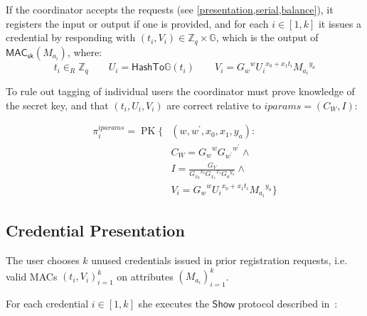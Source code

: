\documentclass{article}
\begin{document}
If the coordinator accepts the requests (see \cref{presentation,serial,balance}), it registers the input or output if one is provided, and for each $i \in [1,k]$ it issues a credential by responding with
$(t_i, V_i) \in \mathbb{Z}_q \times \mathbb{G}$,
which is the output of
$\mathsf{MAC}_{\mathsf{sk}}(M_{a_i})$,
where:
\[
  t_i \in_{R} \mathbb{Z}_{q}
  \qquad
  U_i = \mathsf{HashTo\mathbb{G}}(t_i)
  \qquad
  V_i={G_w}^{w} {U_i}^{x_{0}+x_{1} t_i}{M_{a_i}}^{y_a}
\]


To rule out tagging of individual users the coordinator must prove knowledge of the secret key, and that $(t_i, U_i, V_i)$ are correct relative to $\mathit{iparams}=(C_{W}, I)$:

\begin{align*}
  \pi_{i}^{\mathit{iparams}}=\operatorname{PK}\{ & (w, w^{\prime}, x_{0}, x_{1}, y_a): \\
                                                 &C_{W}={G_{w}}^{w} {G_{w^{\prime}}}^{w^\prime} \land \\
                                                 &I=\frac{G_{V}}{{G_{x_{0}}}^{x_0} {G_{x_1}}^{x_1} {G_a}^{y_a}}  \land \\
                                                 &V_i={G_w}^{w}{U_i}^{x_{0}+x_{1}t_i} {M_{a_i}}^{y_a}
                                                   \}
\end{align*}

\subsection{Credential Presentation}\label{presentation}

The user chooses $k$ unused credentials issued in prior registration requests, i.e. valid MACs $(t_i,V_i)_{i=1}^k$ on attributes $(M_{a_i})_{i=1}^k$.

For each credential $i \in [1, k]$ she executes the $\mathsf{Show}$ protocol described in~\cite{chase2019signal}:
\end{document}
